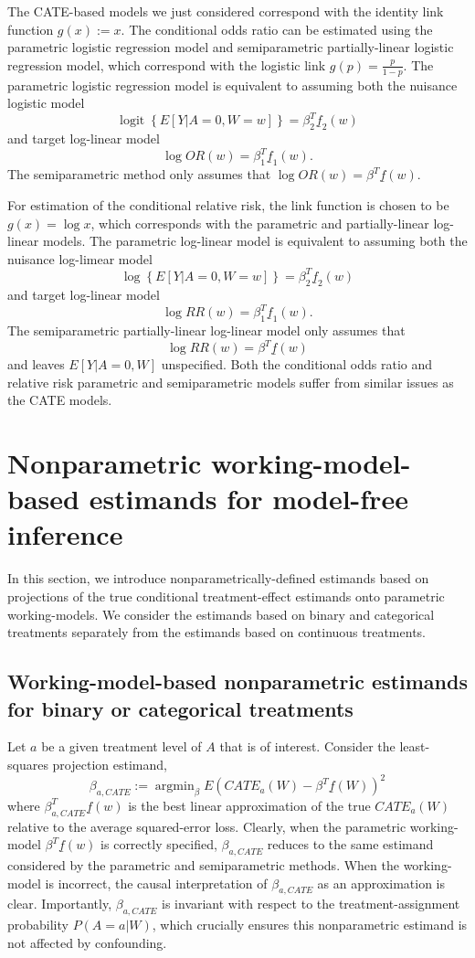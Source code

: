 \documentclass[
]{jss}
\DeclareMathOperator{\logit}{logit}
\DeclareMathOperator{\argmin}{argmin}
\begin{document}
The CATE-based models we just considered correspond with the identity
link function \(g(x) := x\). The conditional odds ratio can be estimated
using the parametric logistic regression model and semiparametric
partially-linear logistic regression model, which correspond with the
logistic link \(g(p) = \frac{p}{1-p}\). The parametric logistic
regression model is equivalent to assuming both the nuisance logistic
model
\[\logit \left\{ E[Y|A=0,W=w] \right\} =  \beta_2^T \underline{f}_2(w) \]
and target log-linear model
\[\log OR(w) = \beta_1^T \underline{f}_1(w).\] The semiparametric method
only assumes that \(\log OR(w) = \beta^T \underline{f}(w).\)

\noindent For estimation of the conditional relative risk, the link
function is chosen to be \(g(x) = \log x\), which corresponds with the
parametric and partially-linear log-linear models. The parametric
log-linear model is equivalent to assuming both the nuisance log-limear
model
\[\log \left\{ E[Y|A=0,W=w] \right\} =  \beta_2^T \underline{f}_2(w) \]
and target log-linear model
\[\log RR(w) = \beta_1^T \underline{f}_1(w).\] The semiparametric
partially-linear log-linear model only assumes that
\[\log RR(w) = \beta^T \underline{f}(w)\] and leaves \(E[Y|A=0,W]\)
unspecified. Both the conditional odds ratio and relative risk
parametric and semiparametric models suffer from similar issues as the
CATE models.

\section{Nonparametric working-model-based estimands for model-free inference}

In this section, we introduce nonparametrically-defined estimands based
on projections of the true conditional treatment-effect estimands onto
parametric working-models. We consider the estimands based on binary and
categorical treatments separately from the estimands based on continuous
treatments.

\subsection{Working-model-based nonparametric estimands for binary or categorical treatments}

Let \(a\) be a given treatment level of \(A\) that is of interest.
Consider the least-squares projection estimand,
\[\beta_{a,CATE} := \argmin_{\beta} E\left(CATE_a(W) - \beta^T \underline{f}(W) \right)^2\]
where \(\beta_{a,CATE}^T \underline{f}(w)\) is the best linear
approximation of the true \(CATE_a(W)\) relative to the average
squared-error loss. Clearly, when the parametric working-model
\(\beta^T \underline{f}(w)\) is correctly specified, \(\beta_{a,CATE}\)
reduces to the same estimand considered by the parametric and
semiparametric methods. When the working-model is incorrect, the causal
interpretation of \(\beta_{a,CATE}\) as an approximation is clear.
Importantly, \(\beta_{a,CATE}\) is invariant with respect to the
treatment-assignment probability \(P(A=a|W)\), which crucially ensures
this nonparametric estimand is not affected by confounding.
\end{document}
